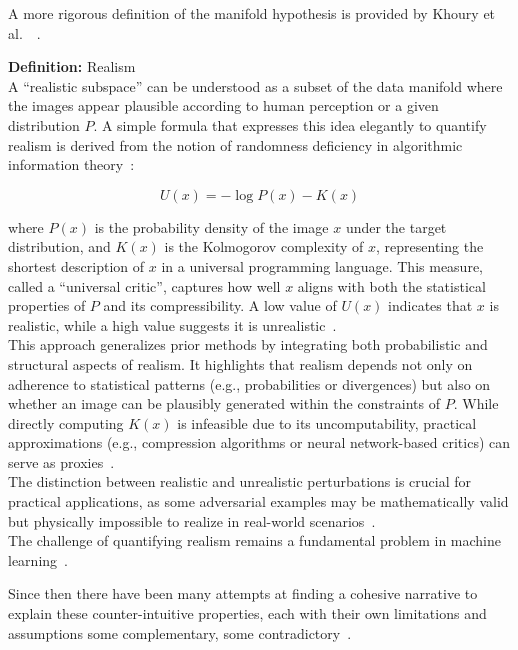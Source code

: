\documentclass[a4paper, oneside]{discothesis}
\begin{document}
\begin{highlightbox}
	A more rigorous definition of the manifold hypothesis is provided by Khoury et al.\ ~\cite{khoury2018geometry}.
\end{highlightbox}

\begin{highlightbox}
	\textbf{Definition:} Realism  \\

	A ``realistic subspace'' can be understood as a subset of the data manifold where the images appear plausible according to human perception or a given distribution $P$. A simple formula that expresses this idea elegantly to quantify realism is derived from the notion of randomness deficiency in algorithmic information theory~\cite{theis2024makes}:

	$$U(x) = -\log P(x) - K(x)$$

	where $P(x)$ is the probability density of the image $x$ under the target distribution, and $K(x)$ is the Kolmogorov complexity of $x$, representing the shortest description of $x$ in a universal programming language. This measure, called a ``universal critic'', captures how well $x$ aligns with both the statistical properties of $P$ and its compressibility. A low value of $U(x)$ indicates that $x$ is realistic, while a high value suggests it is unrealistic~\cite{theis2024makes}. \\

	This approach generalizes prior methods by integrating both probabilistic and structural aspects of realism. It highlights that realism depends not only on adherence to statistical patterns (e.g., probabilities or divergences) but also on whether an image can be plausibly generated within the constraints of $P$. While directly computing $K(x)$ is infeasible due to its uncomputability, practical approximations (e.g., compression algorithms or neural network-based critics) can serve as proxies~\cite{theis2024makes}. \\

	The distinction between realistic and unrealistic perturbations is crucial for practical applications, as some adversarial examples may be mathematically valid but physically impossible to realize in real-world scenarios~\cite{dyrmishi2023empirical}. \\
	
	The challenge of quantifying realism remains a fundamental problem in machine learning~\cite{theis2024makes}.
\end{highlightbox}

Since then there have been many attempts at finding a cohesive narrative to explain these counter-intuitive properties, each with their own limitations and assumptions \textendash{} some complementary, some contradictory~\cite{ilyas2019adversarial}.
\end{document}
